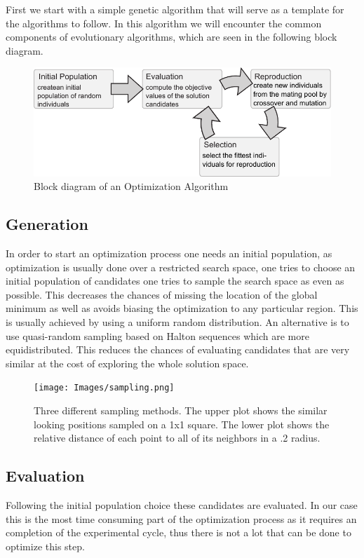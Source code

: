 \documentclass[a4paper,titlepage]{report}
\begin{document}
First we start with a simple genetic algorithm that will serve as a template for the algorithms to follow. In this algorithm we will encounter the common components of evolutionary algorithms, which are seen in the following block diagram. 


\begin{figure}[htb]
\centering
\includegraphics{Images/evolution_v2.pdf}
\caption{Block diagram of an Optimization Algorithm \cite{weise}}
\label{fig: genetic algorithms}
\end{figure}

\subsection{Generation}
In order to start an optimization process one needs an initial population, as optimization is usually done over a restricted search space, one tries to  choose an initial population of candidates one tries to sample the search space as even as possible. This decreases the chances of missing the location of the global minimum as well as avoids biasing the optimization to any particular region. This is usually achieved by using a uniform random distribution. An alternative is to use quasi-random sampling based on Halton sequences which are more equidistributed. This reduces the chances of evaluating candidates that are very similar at the cost of exploring the whole solution space.

\begin{figure}[htb]
\centering
\texttt{[image: Images/sampling.png]}
\caption{Three different sampling methods. The upper plot shows the similar looking positions sampled on a 1x1 square. The lower plot shows the relative distance of each point to all of its neighbors in a .2 radius. \cite{hayes} }
\label{fig: sampling}
\end{figure}

\subsection{Evaluation}
Following the initial population choice these candidates are evaluated. In our case this is the most time consuming part of the optimization process as it requires an completion of the experimental cycle, thus there is not a lot that can be done to optimize this step.
\end{document}

